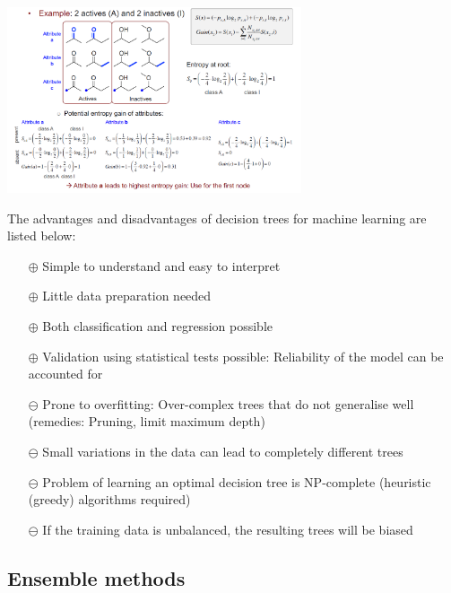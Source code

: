 
\begin{center}\includegraphics[width=0.65\textwidth]{img/machine/MachineDecisionTreesEntropyExample.png}\end{center}

The advantages and disadvantages of decision trees for machine learning are listed below:

\begin{itemize}
    \item[$\oplus$] Simple to understand and easy to interpret
    \item[$\oplus$] Little data preparation needed
    \item[$\oplus$] Both classification and regression possible
    \item[$\oplus$] Validation using statistical tests possible: Reliability of the model can be accounted for
    \item[$\ominus$] Prone to overfitting: Over-complex trees that do not generalise well (remedies: Pruning, limit maximum depth)
    \item[$\ominus$] Small variations in the data can lead to completely different trees
    \item[$\ominus$] Problem of learning an optimal decision tree is NP-complete (heuristic (greedy) algorithms required)
    \item[$\ominus$] If the training data is unbalanced, the resulting trees will be biased
\end{itemize}

\subsection{Ensemble methods}

